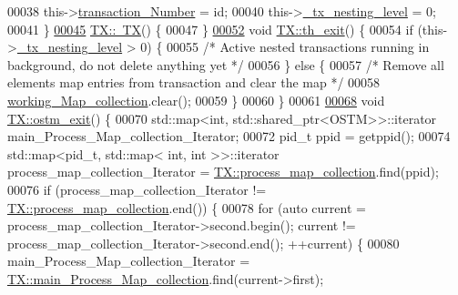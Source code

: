 \begin{DoxyCode}
00038     this->\hyperlink{class_t_x_a145a1c74b521f277fe481971a930b249_a145a1c74b521f277fe481971a930b249}{transaction\_Number} = id;
00040     this->\hyperlink{class_t_x_ae8f413fd7f4fea322e7ad3c668f9898e_ae8f413fd7f4fea322e7ad3c668f9898e}{\_tx\_nesting\_level} = 0;
00041 \}
\hypertarget{_t_x_8cpp_source.tex_l00045}{}\hyperlink{class_t_x_abecf854cc3228ab6dd51175b3cd1c70a_abecf854cc3228ab6dd51175b3cd1c70a}{00045} \hyperlink{class_t_x_abecf854cc3228ab6dd51175b3cd1c70a_abecf854cc3228ab6dd51175b3cd1c70a}{TX::~TX}() \{
00047 \}
\hypertarget{_t_x_8cpp_source.tex_l00052}{}\hyperlink{class_t_x_ae045534c4a9d39bd5c6ea2a39a372a79_ae045534c4a9d39bd5c6ea2a39a372a79}{00052} \textcolor{keywordtype}{void} \hyperlink{class_t_x_ae045534c4a9d39bd5c6ea2a39a372a79_ae045534c4a9d39bd5c6ea2a39a372a79}{TX::th\_exit}() \{
00054     \textcolor{keywordflow}{if} (this->\hyperlink{class_t_x_ae8f413fd7f4fea322e7ad3c668f9898e_ae8f413fd7f4fea322e7ad3c668f9898e}{\_tx\_nesting\_level} > 0) \{
00055         \textcolor{comment}{/* Active nested transactions running in background, do not delete anything yet */}
00056     \} \textcolor{keywordflow}{else} \{
00057         \textcolor{comment}{/* Remove all elements map entries from transaction and clear the map */}
00058         \hyperlink{class_t_x_a81aafda16e2f20e36ec6c68e584668ff_a81aafda16e2f20e36ec6c68e584668ff}{working\_Map\_collection}.clear();
00059     \}
00060 \}
00061 
\hypertarget{_t_x_8cpp_source.tex_l00068}{}\hyperlink{class_t_x_aa9739c5c2077454c779098db7baefc2b_aa9739c5c2077454c779098db7baefc2b}{00068} \textcolor{keywordtype}{void} \hyperlink{class_t_x_aa9739c5c2077454c779098db7baefc2b_aa9739c5c2077454c779098db7baefc2b}{TX::ostm\_exit}() \{
00070     std::map<int, std::shared\_ptr<OSTM>>::iterator main\_Process\_Map\_collection\_Iterator;
00072     pid\_t ppid = getppid();
00074     std::map<pid\_t, std::map< int, int >>::iterator process\_map\_collection\_Iterator = 
      \hyperlink{class_t_x_a2e3cd2f52fd93cf6ef3eb3c1cb830b9f_a2e3cd2f52fd93cf6ef3eb3c1cb830b9f}{TX::process\_map\_collection}.find(ppid);
00076     \textcolor{keywordflow}{if} (process\_map\_collection\_Iterator != \hyperlink{class_t_x_a2e3cd2f52fd93cf6ef3eb3c1cb830b9f_a2e3cd2f52fd93cf6ef3eb3c1cb830b9f}{TX::process\_map\_collection}.end()) \{
00078         \textcolor{keywordflow}{for} (\textcolor{keyword}{auto} current = process\_map\_collection\_Iterator->second.begin(); current != 
      process\_map\_collection\_Iterator->second.end(); ++current) \{
00080             main\_Process\_Map\_collection\_Iterator = 
      \hyperlink{class_t_x_a1a45d726894190695314464d7cd97c29_a1a45d726894190695314464d7cd97c29}{TX::main\_Process\_Map\_collection}.find(current->first);

\end{DoxyCode}
